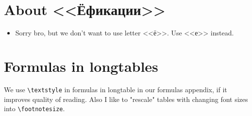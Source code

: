 \documentclass[a5paper,openany,9pt]{extbook}
\begin{document}
\section{About <<Ёфикации>>}
\begin{itemize}
\item
Sorry bro, but we don't want to use letter <<ё>>. Use <<е>> instead.
\end{itemize}

\section{Formulas in longtables}

We use \verb=\textstyle= in formulas in longtable in our formulas appendix, if it improves quality of reading. Also I like to "rescale" tables with changing font sizes into \verb=\footnotesize=.
\end{document}
